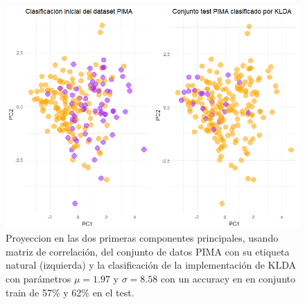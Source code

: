 \documentclass[paper=letter, fontsize=11pt]{scrartcl}
\numberwithin{equation}{section} %
\numberwithin{figure}{section} %
\numberwithin{table}{section} %
\begin{document}
\begin{figure}[H]
  \begin{center}
    \includegraphics[scale=0.7]{kernel_pima.png}
    \caption{Proyeccion en las dos primeras componentes principales, usando matriz de correlación, del conjunto de datos PIMA con su etiqueta natural (izquierda) y la clasificación de la implementación de KLDA con parámetros $\mu = 1.97$ y $\sigma = 8.58$  con un accuracy en en conjunto train de 57\% y 62\% en el test. }
    \label{figura4_4}
  \end{center}
\end{figure}
\end{document}
